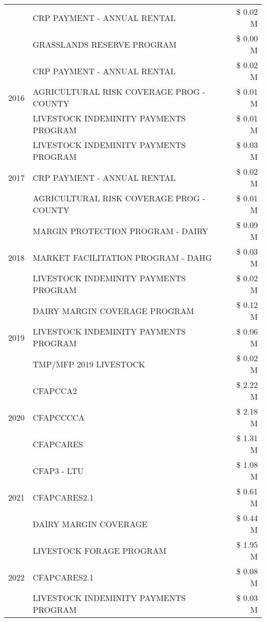 \begin{tabular}{llr}
 & CRP PAYMENT - ANNUAL RENTAL & \$ 0.02 M \\
 & GRASSLANDS RESERVE PROGRAM & \$ 0.00 M \\
\cline{1-3}
\multirow[t]{3}{*}{2016} & CRP PAYMENT - ANNUAL RENTAL & \$ 0.02 M \\
 & AGRICULTURAL RISK COVERAGE PROG - COUNTY & \$ 0.01 M \\
 & LIVESTOCK INDEMINITY PAYMENTS PROGRAM & \$ 0.01 M \\
\cline{1-3}
\multirow[t]{3}{*}{2017} & LIVESTOCK INDEMINITY PAYMENTS PROGRAM & \$ 0.03 M \\
 & CRP PAYMENT - ANNUAL RENTAL & \$ 0.02 M \\
 & AGRICULTURAL RISK COVERAGE PROG - COUNTY & \$ 0.01 M \\
\cline{1-3}
\multirow[t]{3}{*}{2018} & MARGIN PROTECTION PROGRAM - DAIRY & \$ 0.09 M \\
 & MARKET FACILITATION PROGRAM - DAHG & \$ 0.03 M \\
 & LIVESTOCK INDEMINITY PAYMENTS PROGRAM & \$ 0.02 M \\
\cline{1-3}
\multirow[t]{3}{*}{2019} & DAIRY MARGIN COVERAGE PROGRAM & \$ 0.12 M \\
 & LIVESTOCK INDEMINITY PAYMENTS PROGRAM & \$ 0.06 M \\
 & TMP/MFP 2019 LIVESTOCK & \$ 0.02 M \\
\cline{1-3}
\multirow[t]{3}{*}{2020} & CFAPCCA2 & \$ 2.22 M \\
 & CFAPCCCCA & \$ 2.18 M \\
 & CFAPCARES & \$ 1.31 M \\
\cline{1-3}
\multirow[t]{3}{*}{2021} & CFAP3 - LTU & \$ 1.08 M \\
 & CFAPCARES2.1 & \$ 0.61 M \\
 & DAIRY MARGIN COVERAGE & \$ 0.44 M \\
\cline{1-3}
\multirow[t]{3}{*}{2022} & LIVESTOCK FORAGE PROGRAM & \$ 1.95 M \\
 & CFAPCARES2.1 & \$ 0.08 M \\
 & LIVESTOCK INDEMINITY PAYMENTS PROGRAM & \$ 0.03 M \\
\cline{1-3}
\bottomrule
\end{tabular}
